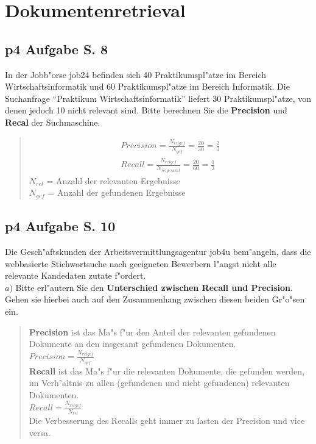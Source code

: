 \section{Dokumentenretrieval}

\subsection{p4 Aufgabe S. 8}

In der Jobb"orse job24 befinden sich 40 Praktikumspl"atze im Bereich Wirtschaftsinformatik und 60 Praktikumspl"atze im Bereich Informatik.
Die Suchanfrage "`Praktikum Wirtschaftsinformatik"' liefert 30 Praktikumspl"atze, von denen jedoch 10 nicht relevant sind.
Bitte berechnen Sie die \textbf{Precision} und \textbf{Recal} der Suchmaschine.\\

\begin{quote}
    \begin{align*}
        Precision = \frac{N_{relgef}}{ N_{gef}} = \frac{20}{30} = \frac{2}{3}\\
        Recall = \frac{N_{relgef}}{N_{relgesamt}} = \frac{20}{60} = \frac{1}{3}
    \end{align*}
    {\tiny $N_{rel}$ = Anzahl der relevanten Ergebnisse}\\
    {\tiny $N_{gef}$ = Anzahl der gefundenen Ergebnisse}
\end{quote}


\subsection{p4 Aufgabe S. 10}
Die Gesch"aftskunden der Arbeitsvermittlungsagentur job4u bem"angeln, dass die webbasierte Stichwortsuche nach geeigneten Bewerbern l"angst nicht alle relevante Kandedaten zutate f"ordert.\\

\noindent
$a)$ Bitte erl"autern Sie den \textbf{Unterschied zwischen Recall und Precision}.
Gehen sie hierbei auch auf den Zusammenhang zwischen diesen beiden Gr"o"sen ein.\\

\begin{quote}
    \textbf{Precision} ist das Ma"s f"ur den Anteil der relevanten gefundenen Dokumente an den insgesamt gefundenen Dokumenten.\\

    $Precision = \frac{N_{relgef}}{N_{gef}}$\\

    \textbf{Recall} ist das Ma"s f"ur die relevanten Dokumente, die gefunden werden, im Verh"altnis zu allen (gefundenen und nicht gefundenen) relevanten Dokumenten.\\

    $Recall = \frac{N_{relgef}}{N_{rel}}$\\


    Die Verbesserung des Recalls geht immer zu lasten der Precision und vice versa.
\end{quote}

